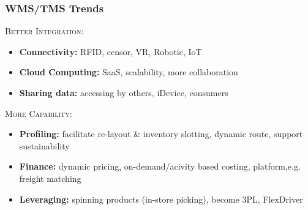 \documentclass[10pt,handout,notes=show]{beamer}
\begin{document}
\begin{frame}
  \frametitle{WMS/TMS Trends}

    \textsc{Better Integration:}
     \begin{itemize}
      \item \textbf{Connectivity:} RFID, \alert{censor}, VR, Robotic, IoT
      \item \textbf{Cloud Computing:}  SaaS, scalability, more collaboration
      \item \textbf{Sharing data:} accessing by others, iDevice, \alert{consumers}
    \end{itemize}

    \NextLine
    \textsc{More Capability:}
    \begin{itemize}
      \item \textbf{Profiling:} \alert{facilitate} re-layout \& inventory slotting, dynamic route, support sustainability
      \item \textbf{Finance:} dynamic pricing, on-demand/acivity based costing, platform,e.g. freight matching
      \item \textbf{Leveraging:} spinning products (in-store picking), become 3PL, FlexDriver
    \end{itemize}

\end{frame}
\end{document}
